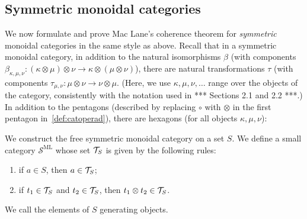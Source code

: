 


\subsection{Symmetric monoidal categories} 

We now formulate and prove Mac Lane's coherence theorem for \emph{symmetric} monoidal categories in the same style as above.  Recall that in a symmetric monoidal category, in addition to the natural isomorphisms $\beta$ (with components $\beta_{\kappa,\mu,\nu}:(\kappa\otimes\mu)\otimes\nu\to
\kappa\otimes(\mu\otimes\nu)$), there are natural transformations $\tau$ (with components $\tau_{\mu,\nu}:\mu\otimes\nu\to\nu\otimes\mu$. (Here, we use $\kappa,\mu,\nu,\ldots$ range over the objects of the category, consistently with the notation used in *** Sections 2.1 and 2.2 ***.)
In addition to  the pentagons (described by replacing $\circ$ with $\otimes$ in the first pentagon in~\cref{def:catoperad}), there are hexagons (for all objects $\kappa,\mu,\nu$):
\begin{center}
\end{center}


We construct the free symmetric monoidal category on a set $S$.
We define a small category $\mathcal{S}^{\mathrm{ML}}$ whose set ${\cal T}_S$  is  given by the following rules:
\begin{enumerate}
    \item if $a \in S$, then $a\in{\cal T}_S$;
    \item if $t_1 \in {\cal T}_S$ and $t_2 \in {\cal T}_S$, then $t_1 \otimes t_2\in{\cal T}_S$.
\end{enumerate}
We call the elements of $S$ generating objects.

